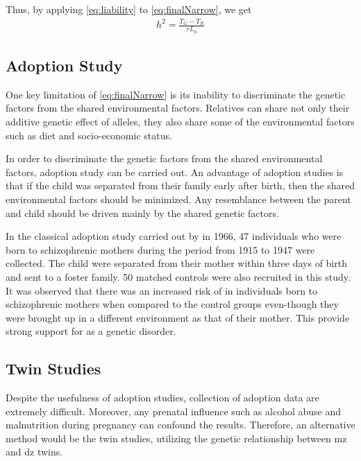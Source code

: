 	Thus, by applying \cref{eq:liability} to \cref{eq:finalNarrow}, we get
	\begin{align}
	h^2 =\frac{T_G-T_R}{rL_a}
	\end{align}
	
	\subsection{Adoption Study}
	One key limitation of \cref{eq:finalNarrow} is its inability to discriminate the genetic factors from the shared environmental factors.
	Relatives can share not only their additive genetic effect of alleles, they also share some of the environmental factors such as diet and socio-economic status. 
	
	In order to discriminate the genetic factors from the shared environmental factors, adoption study can be carried out. 
	An advantage of adoption studies is that if the child was separated from their family early after birth, then the shared environmental factors should be minimized.
	Any resemblance between the parent and child should be driven mainly by the shared genetic factors.
	
	
	In the classical adoption study carried out by \citet{HESTON1966} in 1966, 47 individuals who were born to schizophrenic mothers during the period from 1915 to 1947 were collected. 
	The child were separated from their mother within three days of birth and sent to a foster family. 
	50 matched controls were also recruited in this study.
	It was observed that there was an increased risk of  in individuals born to schizophrenic mothers when compared to the control groups even-though they were brought up in a different environment as that of their mother.
	This provide strong support for  as a genetic disorder. 
	
	\subsection{Twin Studies}
	Despite the usefulness of adoption studies, collection of adoption data are extremely difficult. 
	Moreover, any prenatal influence such as alcohol abuse and malnutrition during pregnancy can confound the results.
	Therefore, an alternative method would be the twin studies, utilizing the genetic relationship between \gls{mz} and \gls{dz} twins.
	
